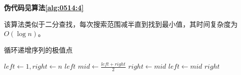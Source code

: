 \documentclass[answers]{exam}
\begin{document}
\begin{questions}
\begin{solution}
        \textbf{伪代码见算法\ref{alg:0514:4}}

        该算法类似于二分查找，每次搜索范围减半直到找到最小值，其时间复杂度为$O(\log n)$。

    \end{solution}

    \begin{algorithm}[!ht]
        \caption{循环递增序列的极值点}\label{alg:0514:4}
        \begin{algorithmic}[1]
            \State $left \gets 1, right \gets n$
                
            \State \Return $left$
            \Else
            \Repeat
            \State $mid \gets \frac{left + right}{2}$
                 
            \State $right \gets mid$
            \Else                           {}
            \State $left \gets mid$
            \EndIf
            \State \Return $right$
            \EndIf
        \end{algorithmic}
    \end{algorithm}

\end{questions}
\end{document}
